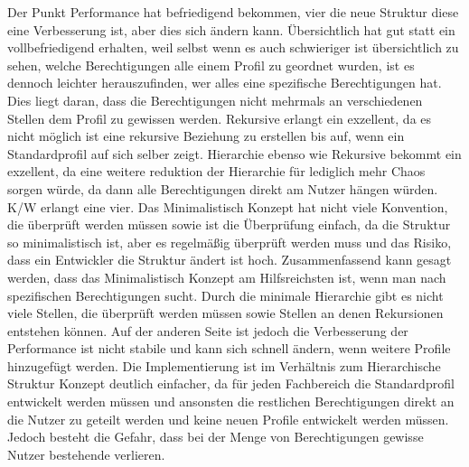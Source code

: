 Der Punkt Performance hat befriedigend bekommen, vier die neue Struktur diese eine Verbesserung ist, aber dies sich ändern kann.
Übersichtlich hat gut statt ein vollbefriedigend erhalten, weil selbst wenn es auch schwieriger ist übersichtlich zu sehen, welche Berechtigungen alle einem Profil zu geordnet wurden, ist es dennoch leichter herauszufinden, wer alles eine spezifische Berechtigungen hat.
Dies liegt daran, dass die Berechtigungen nicht mehrmals an verschiedenen Stellen dem Profil zu gewissen werden.
Rekursive erlangt ein exzellent, da es nicht möglich ist eine rekursive Beziehung zu erstellen bis auf, wenn ein Standardprofil auf sich selber zeigt.
Hierarchie ebenso wie Rekursive bekommt ein exzellent, da eine weitere reduktion der Hierarchie für lediglich mehr Chaos sorgen würde, da dann alle Berechtigungen direkt am Nutzer hängen würden.
\ac{K/W} erlangt eine vier. 
Das Minimalistisch Konzept hat nicht viele Konvention, die überprüft werden müssen sowie ist die Überprüfung einfach, da die Struktur so minimalistisch ist, aber es regelmäßig überprüft werden muss und das Risiko, dass ein Entwickler die Struktur ändert ist hoch.
\newline
\newline
Zusammenfassend kann gesagt werden, dass das Minimalistisch Konzept am Hilfsreichsten ist, wenn man nach spezifischen Berechtigungen sucht.
Durch die minimale Hierarchie gibt es nicht viele Stellen, die überprüft werden müssen sowie Stellen an denen Rekursionen entstehen können.
Auf der anderen Seite ist jedoch die Verbesserung der Performance ist nicht stabile und kann sich schnell ändern, wenn weitere Profile hinzugefügt werden.
Die Implementierung ist im Verhältnis zum Hierarchische Struktur Konzept deutlich einfacher, da für jeden Fachbereich die Standardprofil entwickelt werden müssen und ansonsten die restlichen Berechtigungen direkt an die Nutzer zu geteilt werden und keine neuen Profile entwickelt werden müssen.
Jedoch besteht die Gefahr, dass bei der Menge von Berechtigungen gewisse Nutzer bestehende verlieren.

